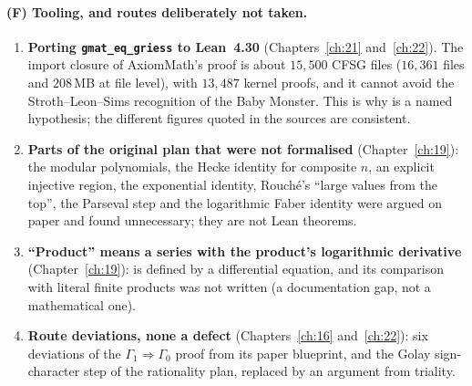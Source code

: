 \paragraph{(F) Tooling, and routes deliberately not taken.}
\begin{enumerate}
\item \textbf{Porting \texttt{gmat\_eq\_griess} to Lean~4.30} (Chapters~\ref{ch:21} and~\ref{ch:22}). The import closure of
  AxiomMath's proof is about $15{,}500$ CFSG files ($16{,}361$ files and $208$\,MB at file level), with $13{,}487$ kernel
   proofs, and it cannot avoid the Stroth--Leon--Sims recognition of the Baby Monster. This is why
   is a named hypothesis; the different figures quoted in the sources are consistent.
\item \textbf{Parts of the original plan that were not formalised} (Chapter~\ref{ch:19}): the modular polynomials, the
  Hecke identity for composite $n$, an explicit injective region, the exponential identity, Rouch\'e's ``large values from
  the top'', the Parseval step and the logarithmic Faber identity were argued on paper and found unnecessary; they are not
  Lean theorems.
\item \textbf{``Product'' means a series with the product's logarithmic derivative} (Chapter~\ref{ch:19}): 
  is defined by a differential equation, and its comparison with literal finite products was not written (a documentation
  gap, not a mathematical one).
\item \textbf{Route deviations, none a defect} (Chapters~\ref{ch:16} and~\ref{ch:22}): six deviations of the
  $\Gamma_1\Rightarrow\Gamma_0$ proof from its paper blueprint, and the Golay sign-character step of the rationality plan,
  replaced by an argument from triality.
\end{enumerate}

